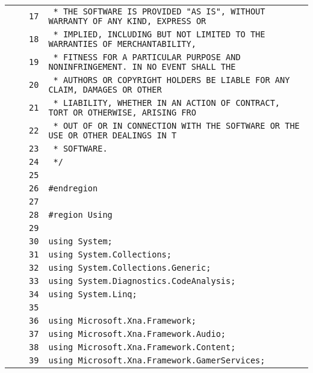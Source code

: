 \documentclass[a4paper,10pt]{article}
\begin{document}
\begin{longtable}[l]{lrrl}
\cellcolor{gray} &  & \verb~17~ & \verb~ * THE SOFTWARE IS PROVIDED "AS IS", WITHOUT WARRANTY OF ANY KIND, EXPRESS OR~\\
\cellcolor{gray} &  & \verb~18~ & \verb~ * IMPLIED, INCLUDING BUT NOT LIMITED TO THE WARRANTIES OF MERCHANTABILITY,~\\
\cellcolor{gray} &  & \verb~19~ & \verb~ * FITNESS FOR A PARTICULAR PURPOSE AND NONINFRINGEMENT. IN NO EVENT SHALL THE~\\
\cellcolor{gray} &  & \verb~20~ & \verb~ * AUTHORS OR COPYRIGHT HOLDERS BE LIABLE FOR ANY CLAIM, DAMAGES OR OTHER~\\
\cellcolor{gray} &  & \verb~21~ & \verb~ * LIABILITY, WHETHER IN AN ACTION OF CONTRACT, TORT OR OTHERWISE, ARISING FRO~\\
\cellcolor{gray} &  & \verb~22~ & \verb~ * OUT OF OR IN CONNECTION WITH THE SOFTWARE OR THE USE OR OTHER DEALINGS IN T~\\
\cellcolor{gray} &  & \verb~23~ & \verb~ * SOFTWARE.~\\
\cellcolor{gray} &  & \verb~24~ & \verb~ */~\\
\cellcolor{gray} &  & \verb~25~ & \verb~~\\
\cellcolor{gray} &  & \verb~26~ & \verb~#endregion~\\
\cellcolor{gray} &  & \verb~27~ & \verb~~\\
\cellcolor{gray} &  & \verb~28~ & \verb~#region Using~\\
\cellcolor{gray} &  & \verb~29~ & \verb~~\\
\cellcolor{gray} &  & \verb~30~ & \verb~using System;~\\
\cellcolor{gray} &  & \verb~31~ & \verb~using System.Collections;~\\
\cellcolor{gray} &  & \verb~32~ & \verb~using System.Collections.Generic;~\\
\cellcolor{gray} &  & \verb~33~ & \verb~using System.Diagnostics.CodeAnalysis;~\\
\cellcolor{gray} &  & \verb~34~ & \verb~using System.Linq;~\\
\cellcolor{gray} &  & \verb~35~ & \verb~~\\
\cellcolor{gray} &  & \verb~36~ & \verb~using Microsoft.Xna.Framework;~\\
\cellcolor{gray} &  & \verb~37~ & \verb~using Microsoft.Xna.Framework.Audio;~\\
\cellcolor{gray} &  & \verb~38~ & \verb~using Microsoft.Xna.Framework.Content;~\\
\cellcolor{gray} &  & \verb~39~ & \verb~using Microsoft.Xna.Framework.GamerServices;~\\

\end{longtable}
\end{document}
